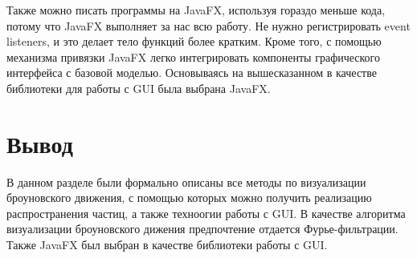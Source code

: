 Также можно писать программы на JavaFX, используя гораздо меньше кода, потому что JavaFX выполняет за нас всю работу. Не нужно регистрировать event listeners, и это делает тело функций более кратким. Кроме того, с помощью механизма привязки JavaFX легко интегрировать компоненты графического интерфейса с базовой моделью. Основываясь на вышесказанном в качестве библиотеки для работы с GUI была выбрана JavaFX.

\section*{Вывод}

В данном разделе были формально описаны все методы по визуализации броуновского движения, с помощью которых можно получить реализацию распространения частиц, а также техноогии работы с GUI. В качестве алгоритма визуализации броуновского дижения предпочтение отдается Фурье-фильтрации. Также JavaFX был выбран в качестве библиотеки работы с GUI.

